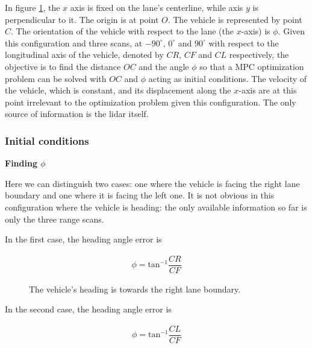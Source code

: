 In figure \ref{fig:centerline_mpc}, the $x$ axis is fixed on the lane's
centerline, while axis $y$ is perpendicular to it. The origin is at point
$O$. The vehicle is represented by point $C$. The orientation of the vehicle
with respect to the lane (the $x$-axis) is $\phi$. Given this configuration
and three scans, at $-90^{\circ}$, $0^{\circ}$ and $90^{\circ}$ with
respect to the longitudinal axis of the vehicle, denoted by $CR$, $CF$ and
$CL$ respectively, the objective is to find the distance $OC$ and the angle
$\phi$ so that a MPC optimization problem can be solved with $OC$ and $\phi$
acting as initial conditions. The velocity of the vehicle,
which is constant, and its displacement along the $x$-axis are at this point
irrelevant to the optimization problem given this configuration. The only
source of information is the lidar itself.

\begin{figure}[H]\centering
  \scalebox{1}{}
  \caption{}
  \label{fig:centerline_mpc}
\end{figure}


\subsubsection{Initial conditions}

\textbf{Finding $\phi$}

Here we can distinguish two cases: one where the vehicle is facing the right
lane boundary and one where it is facing the left one. It is not obvious
in this configuration where the vehicle is heading: the only available
information so far is only the three range scans.

In the first case, the heading angle error is

\begin{align}
  \phi = \text{tan}^{-1}\dfrac{CR}{CF}
\end{align}

\begin{figure}[H]\centering
  \scalebox{1}{}
  \caption{The vehicle's heading is towards the right lane boundary.}
  \label{}
\end{figure}

In the second case, the heading angle error is

\begin{align}
  \phi = \text{tan}^{-1}\dfrac{CL}{CF}
\end{align}

